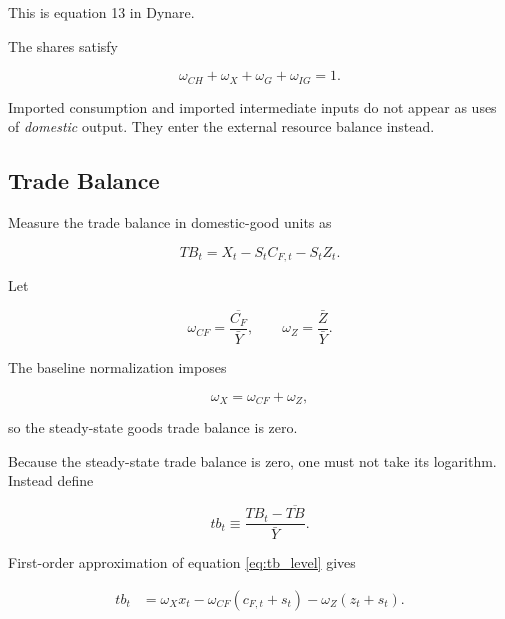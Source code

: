 This is equation 13 in Dynare.

The shares satisfy

\begin{equation}
\boxed{
\omega_{CH}+\omega_X+\omega_G+\omega_{IG}=1.
}
\label{eq:domestic_share_identity}
\end{equation}

Imported consumption and imported intermediate inputs do not appear as uses of
\emph{domestic} output. They enter the external resource balance instead.

\subsection{Trade Balance}
\label{app:tradebalance}

Measure the trade balance in domestic-good units as

\begin{equation}
TB_t
=
X_t
-
S_tC_{F,t}
-
S_tZ_t.
\label{eq:tb_level}
\end{equation}

Let

\begin{equation}
\omega_{CF}
=
\frac{\overline{C_F}}{\bar Y},
\qquad
\omega_Z
=
\frac{\bar Z}{\bar Y}.
\end{equation}

The baseline normalization imposes

\begin{equation}
\omega_X=\omega_{CF}+\omega_Z,
\label{eq:balanced_trade_normalization}
\end{equation}

so the steady-state goods trade balance is zero.

Because the steady-state trade balance is zero, one must not take its logarithm.
Instead define

\begin{equation}
tb_t
\equiv
\frac{TB_t-\overline{TB}}{\bar Y}.
\end{equation}

First-order approximation of equation \eqref{eq:tb_level} gives

\begin{align}
tb_t
&=
\omega_Xx_t
-
\omega_{CF}(c_{F,t}+s_t)
-
\omega_Z(z_t+s_t).
\end{align}

